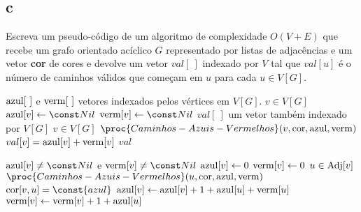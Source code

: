 \subsection{c} Escreva um pseudo-código de um algoritmo de complexidade $O(V +E)$ que recebe um grafo orientado acíclico $G$ representado por listas de adjacências e um vetor \textbf{cor} de cores e devolve um vetor $val[~]$ indexado por $V$ tal que $val[u]$ é o número de caminhos válidos que começam em $u$ para cada $u \in V[G]$.

\itemdsep[0.25]


\newcommand{\Azul}{\const{azul}\xspace}
\newcommand{\Vermelho}{\const{vermelho}\xspace}

\begin{codebox}
\li \Sejam $\mathrm{azul}[~]$ e $\mathrm{verm}[~]$ vetores indexados pelos vértices em $V[G]$.
\li \Para $v \in V[G]$ \Faca
    \Do
\li     $\azul[v] \Recebe \Nulo$
\li     $\verm[v] \Recebe \Nulo$
    \End
\li
\li \Seja $val[~]$ um vetor também indexado por $V[G]$
\li \Para $v \in V[G]$ \Faca
    \Do
\li     $\proc{Caminhos-Azuis-Vermelhos}(v, \cor, \azul, \verm)$
\li     $val[v] = \mathrm{azul}[v] + \mathrm{verm}[v]$
    \End
\li \Retorna $val$
\end{codebox}

\begin{codebox}
\li \Se $\azul[v] \ne \Nulo$ e $\verm[v] \ne \Nulo$
    \Do
\li     \Entao \Retorna
    \End
\li
\li $\mathrm{azul}[v] \leftarrow 0$
\li $\mathrm{verm}[v] \leftarrow 0$
\li \Para $u \in \operatorname{Adj}[v]$ \Faca
    \Do
\li     $\proc{Caminhos-Azuis-Vermelhos}(u, \cor, \azul, \verm)$
\li     \Se $\cor[v,u] = \Azul$
        \Do
\li         \Entao $\mathrm{azul}[v] \leftarrow \mathrm{azul}[v] + 1 + \mathrm{azul}[u] + \mathrm{verm}[u]$
\li         \Senao $\mathrm{verm}[v] \leftarrow \mathrm{verm}[v] + 1 + \mathrm{azul}[u]$
        \End
    \End
\end{codebox}
